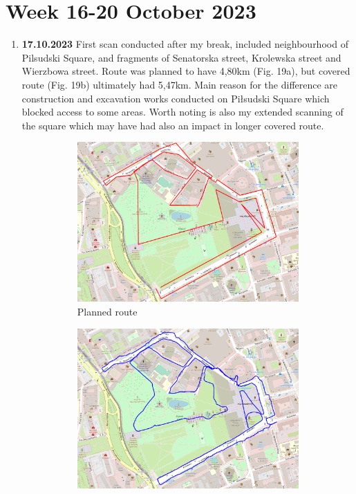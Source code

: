 \documentclass[a4paper,12pt]{article}
\begin{document}
\section{Week 16-20 October 2023}
\begin{enumerate}
	\item \textbf{17.10.2023} First scan conducted after my break, included neighbourhood of Pilsudski Square, and fragments of Senatorska street, Krolewska street and Wierzbowa street. Route was planned to have 4,80km (Fig. 19a), but covered route (Fig. 19b) ultimately had 5,47km. Main reason for the difference are construction and excavation works conducted on Piłsudski Square which blocked access to some areas. Worth noting is also my extended scanning of the square which may have had also an impact in longer covered route.
	\begin{figure}[H]
		\centering
		\begin{subfigure}{.95\textwidth}
			\centering
			\includegraphics[width=1\linewidth]{route_p18}
			\caption{Planned route}
			\label{fig:a18}
		\end{subfigure}%
		\linebreak
		\begin{subfigure}{.95\textwidth}
			\centering
			\includegraphics[width=1\linewidth]{route_c18}

\end{subfigure}
\end{figure}
\end{enumerate}
\end{document}
